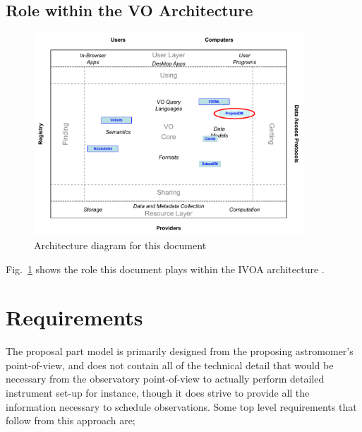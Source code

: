 \documentclass[11pt,a4paper]{ivoa}
\begin{document}
\subsection{Role within the VO Architecture}

\begin{figure}
\centering


\includegraphics[width=0.9\textwidth]{role_diagram.pdf}
\caption{Architecture diagram for this document}
\label{fig:archdiag}
\end{figure}

Fig.~\ref{fig:archdiag} shows the role this document plays within the
IVOA architecture \citep{2010ivoa.rept.1123A}.


\section{Requirements}

The proposal part model is primarily designed from the proposing astromomer's point-of-view, and does not contain all of the technical detail
that would be necessary from the observatory point-of-view to actually perform detailed instrument set-up for instance, though it does
strive to provide all the information necessary to schedule observations. Some top level requirements that follow from this approach are;
\end{document}
